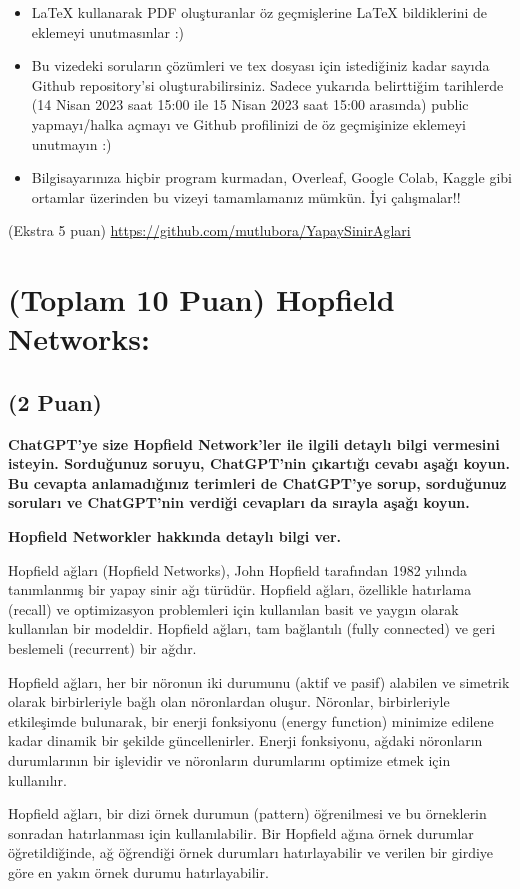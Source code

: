 \documentclass[11pt]{article}
\begin{document}
\begin{itemize}
    \item LaTeX kullanarak PDF oluşturanlar öz geçmişlerine LaTeX bildiklerini de eklemeyi unutmasınlar :)
    \item Bu vizedeki soruların çözümleri ve tex dosyası için istediğiniz kadar sayıda Github repository'si oluşturabilirsiniz. Sadece yukarıda belirttiğim tarihlerde (14 Nisan 2023 saat 15:00 ile 15 Nisan 2023 saat 15:00 arasında) public yapmayı/halka açmayı ve Github profilinizi de öz geçmişinize eklemeyi unutmayın :)
    \item Bilgisayarınıza hiçbir program kurmadan, Overleaf, Google Colab, Kaggle gibi ortamlar üzerinden bu vizeyi tamamlamanız mümkün. İyi çalışmalar!!
\end{itemize}

(Ekstra 5 puan) \url{https://github.com/mutlubora/YapaySinirAglari}

\newpage
\section{(Toplam 10 Puan) Hopfield Networks:}

\subsection{(2 Puan)} \textbf{ChatGPT’ye size Hopfield Network’ler ile ilgili detaylı bilgi vermesini isteyin. Sorduğunuz soruyu, ChatGPT'nin çıkartığı cevabı aşağı koyun. Bu cevapta anlamadığınız terimleri de ChatGPT’ye sorup, sorduğunuz soruları ve ChatGPT’nin verdiği cevapları da sırayla aşağı koyun.}

\textbf{Hopfield Networkler hakkında detaylı bilgi ver.}

Hopfield ağları (Hopfield Networks), John Hopfield tarafından 1982 yılında tanımlanmış bir yapay sinir ağı türüdür. Hopfield ağları, özellikle hatırlama (recall) ve optimizasyon problemleri için kullanılan basit ve yaygın olarak kullanılan bir modeldir. Hopfield ağları, tam bağlantılı (fully connected) ve geri beslemeli (recurrent) bir ağdır.

Hopfield ağları, her bir nöronun iki durumunu (aktif ve pasif) alabilen ve simetrik olarak birbirleriyle bağlı olan nöronlardan oluşur. Nöronlar, birbirleriyle etkileşimde bulunarak, bir enerji fonksiyonu (energy function) minimize edilene kadar dinamik bir şekilde güncellenirler. Enerji fonksiyonu, ağdaki nöronların durumlarının bir işlevidir ve nöronların durumlarını optimize etmek için kullanılır.

Hopfield ağları, bir dizi örnek durumun (pattern) öğrenilmesi ve bu örneklerin sonradan hatırlanması için kullanılabilir. Bir Hopfield ağına örnek durumlar öğretildiğinde, ağ öğrendiği örnek durumları hatırlayabilir ve verilen bir girdiye göre en yakın örnek durumu hatırlayabilir.
\end{document}

